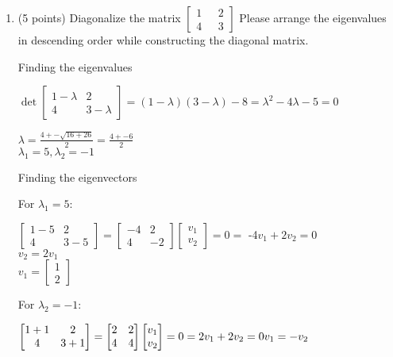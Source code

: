 \documentclass{article}%
\begin{document}
\begin{enumerate}
    \setcounter{enumi}{0}
    \item (5 points) Diagonalize the matrix 
    $\begin{bmatrix}
        1 \ \ \ & 2\\
        4 \ \ \ & 3
    \end{bmatrix}$
    Please arrange the eigenvalues in descending order while constructing the diagonal matrix.

    Finding the eigenvalues
    
    $\det{\begin{bmatrix}
        1 - \lambda & 2\\
        4 & 3 - \lambda
        \end{bmatrix}} = (1 - \lambda)(3 - \lambda) - 8 = \lambda^2 - 4\lambda - 5 = 0$
    
    $\lambda = \frac{4 +- \sqrt{16 + 26}}{2} = \frac{4 +- 6}{2}$ \\
    $\lambda_1 = 5, \lambda_2 = -1$

    Finding the eigenvectors

    For $\lambda_1 = 5$:

    $\begin{bmatrix}
        1 - 5 & 2\\
        4 & 3 - 5
    \end{bmatrix} = \begin{bmatrix}
        -4 & 2\\
        4 & -2 \end{bmatrix} \begin{bmatrix}
            v_1\\
            v_2 \end{bmatrix} = 0 =$
        -4$v_1 + 2v_2 = 0$\\
        $v_2 = 2v_1$\\
    $v_1 = \begin{bmatrix}
        1\\
        2
    \end{bmatrix}$

    For $\lambda_2 = -1$:

    $\begin{bmatrix}
        1 + 1 & 2\\
        4 & 3 + 1 \end{bmatrix} = 
    \begin{bmatrix}
        2 & 2\\
        4 & 4 \end{bmatrix} \begin{bmatrix}
            v_1\\
            v_2 \end{bmatrix} = 0 = 2v_1 + 2v_2 = 0\\
        v_1 = -v_2$


\end{enumerate}
\end{document}
